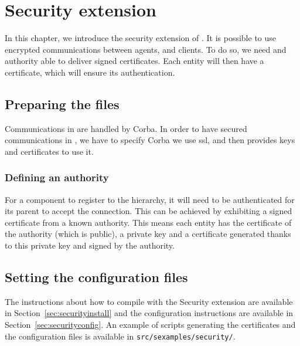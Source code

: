 
\newcommand{\auth}{\emph{Auth}\xspace}

\chapter{Security extension}
\label{ch:Securityextension}

In this chapter, we introduce the security extension of \diet. It is 
possible to use encrypted communications between agents, \seds and clients. 
To do so, we need and authority able to deliver signed certificates. Each 
entity will then have a certificate, which will ensure its authentication.

\section{Preparing the files}

Communications in \diet are handled by Corba. In order to have secured 
communications in \diet, we have to specify Corba we use ssl, and then 
provides keys and certificates to use it.

\subsection{Defining an authority}

For a component to register to the \diet hierarchy, it will need to be 
authenticated for its parent to accept the connection. This can be achieved 
by exhibiting a signed certificate from a known authority. This means each
entity has the certificate of the authority (which is public), a private key and
a certificate generated thanks to this private key and signed by the authority.

\section{Setting the configuration files}

The instructions about how to compile \diet with the Security extension are 
available in Section~\ref{sec:securityinstall} and the configuration 
instructions are available in Section~\ref{sec:securityconfig}.
An example of scripts generating the certificates and the configuration
files is available in \verb+src/sexamples/security/+.



